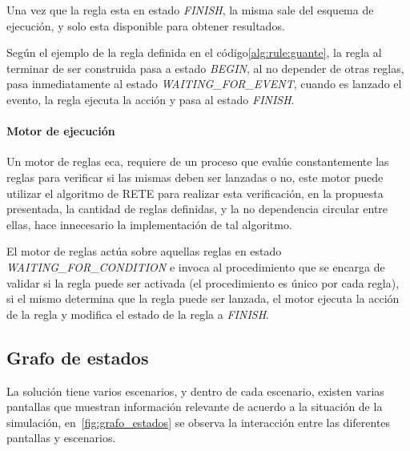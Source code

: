 Una vez que la regla esta en estado \emph{FINISH}, la misma sale del esquema de
ejecución, y solo esta disponible para obtener resultados.

Según el ejemplo de la regla definida en el código\ref{alg:rule:guante}, la
regla al terminar de ser construida pasa a estado \emph{BEGIN}, al no depender
de otras reglas, pasa inmediatamente al estado \emph{WAITING\_FOR\_EVENT},
cuando es lanzado el evento, la regla ejecuta la acción y pasa al estado
\emph{FINISH}.

\paragraph{Motor de ejecución}

Un motor de reglas \gls{eca}, requiere de un proceso que evalúe constantemente
las reglas para verificar si las mismas deben ser lanzadas o
no\cite{bailey2004event}\cite{galton2002two}, este motor puede utilizar el
algoritmo de RETE\cite{de2001eca} para realizar esta verificación, en la
propuesta presentada, la cantidad de reglas definidas, y la no dependencia
circular entre ellas, hace innecesario la implementación de tal
algoritmo\cite{de2001eca}. 

El motor de reglas actúa sobre aquellas reglas en estado
\emph{WAITING\_FOR\_CONDITION} e invoca al procedimiento que se encarga de
validar si la regla puede ser activada (el procedimiento es único por cada
regla), si el mismo determina que la regla puede ser lanzada, el motor ejecuta
la acción de la regla y modifica el estado de la regla a \emph{FINISH}.


\subsection{Grafo de estados}

La solución tiene varios escenarios, y dentro de cada escenario, existen varias
pantallas que muestran información relevante de acuerdo a la situación de la
simulación, en~\ref{fig:grafo_estados} se observa la interacción entre las
diferentes pantallas y escenarios.

